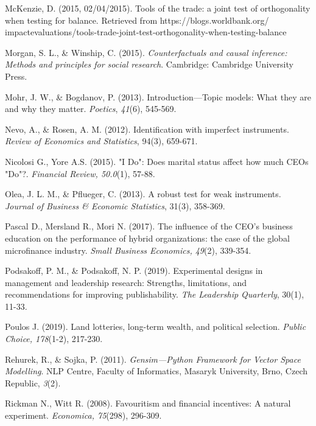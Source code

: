 \documentclass[english]{article}
\begin{document}
\begin{singlespace}
\begin{list}{}{\setlength\itemindent{-\leftmargin}}
\item McKenzie, D. (2015, 02/04/2015). Tools of the trade: a joint test of orthogonality when testing for balance. Retrieved from https://blogs.worldbank.org/ impactevaluations/tools-trade-joint-test-orthogonality-when-testing-balance

\item Morgan, S. L., \& Winship, C. (2015). \emph{Counterfactuals and causal inference: Methods and principles for social research}. Cambridge: Cambridge University Press.

\item Mohr, J. W., \& Bogdanov, P. (2013). Introduction---Topic models: What they are and why they matter. \emph{Poetics}, \emph{41}(6), 545-569.

\item Nevo, A., \& Rosen, A. M. (2012). Identification with imperfect instruments. \emph{Review of Economics and Statistics}, 94(3), 659-671.

\item *Nicolosi G., Yore A.S. (2015). "I Do": Does marital status affect how much CEOs "Do"?. \emph{Financial Review, 50.0}(1), 57-88.

\item Olea, J. L. M., \& Pflueger, C. (2013). A robust test for weak instruments. \emph{Journal of Business \& Economic Statistics}, 31(3), 358-369.

\item *Pascal D., Mersland R., Mori N. (2017). The influence of the CEO's business education on the performance of hybrid organizations: the case of the global microfinance industry. \emph{Small Business Economics, 49}(2), 339-354.

\item Podsakoff, P. M., \& Podsakoff, N. P. (2019). Experimental designs in management and leadership research: Strengths, limitations, and recommendations for improving publishability. \emph{The Leadership Quarterly}, 30(1), 11-33. 

\item *Poulos J. (2019). Land lotteries, long-term wealth, and political selection. \emph{Public Choice, 178}(1-2), 217-230.

\item Rehurek, R., \& Sojka, P. (2011). \emph{Gensim---Python Framework for Vector Space Modelling}. NLP Centre, Faculty of Informatics, Masaryk University, Brno, Czech Republic, \emph{3}(2).

\item *Rickman N., Witt R. (2008). Favouritism and financial incentives: A natural experiment. \emph{Economica, 75}(298), 296-309.


\end{list}
\end{singlespace}
\end{document}
